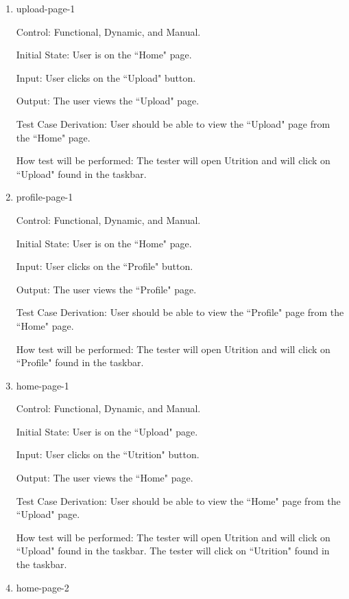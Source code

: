 \documentclass[12pt, titlepage]{article}
\begin{document}
	\begin{enumerate}
		\item{upload-page-1\\}
		
		Control: Functional, Dynamic, and Manual.
		
		Initial State: User is on the ``Home" page.
		
		Input: User clicks on the ``Upload" button.
		
		Output: The user views the ``Upload" page.
		
		Test Case Derivation: User should be able to view the ``Upload" page from the ``Home" page.
		
		How test will be performed: The tester will open Utrition and will click on ``Upload" found in the taskbar.
		
		\item{profile-page-1\\}
		
		Control: Functional, Dynamic, and Manual.
		
		Initial State: User is on the ``Home" page.
		
		Input: User clicks on the ``Profile" button.
		
		Output: The user views the ``Profile" page.
		
		Test Case Derivation: User should be able to view the ``Profile" page from the ``Home" page.
		
		How test will be performed: The tester will open Utrition and will click on ``Profile" found in the taskbar.
		
		\item{home-page-1\\}
		
		Control: Functional, Dynamic, and Manual.
		
		Initial State: User is on the ``Upload" page.
		
		Input: User clicks on the ``Utrition" button.
		
		Output: The user views the ``Home" page.
		
		Test Case Derivation: User should be able to view the ``Home" page from the ``Upload" page.
		
		How test will be performed: The tester will open Utrition and will click on ``Upload" found in the taskbar. The tester will click on ``Utrition" found in the taskbar.
		
		\item{home-page-2\\}
		

\end{enumerate}
\end{document}
